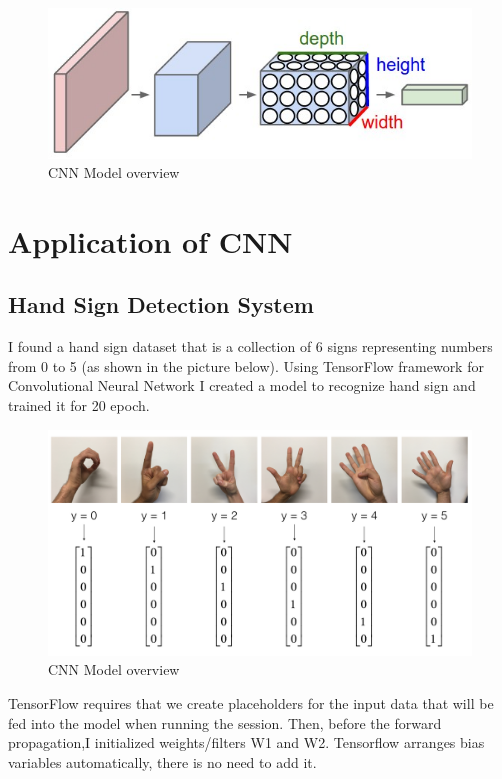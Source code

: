 \documentclass{article}
\begin{document}
\begin{figure}[h!]
	\centering
	\includegraphics[scale=0.55]{model1.jpeg}
	\caption{CNN Model overview}
	\label{fig:univerise}
\end{figure}

\section{Application of CNN}

\subsection{Hand Sign Detection System}
I found a hand sign dataset that is a collection of 6 signs representing numbers from 0 to 5 (as shown in the picture below). Using TensorFlow framework for Convolutional Neural Network I created a model to recognize hand sign and trained it for 20 epoch.

\begin{figure}[h!]
	\centering
	\includegraphics[scale=0.55]{SIGNS.png}
	\caption{CNN Model overview}
	\label{fig:univerise}
\end{figure}

\newpage

TensorFlow requires that we create placeholders for the input data that will be fed into the model when running the session. Then, before the forward propagation,I initialized weights/filters  W1  and  W2. Tensorflow arranges bias variables automatically, there is no need to add it.
\end{document}
